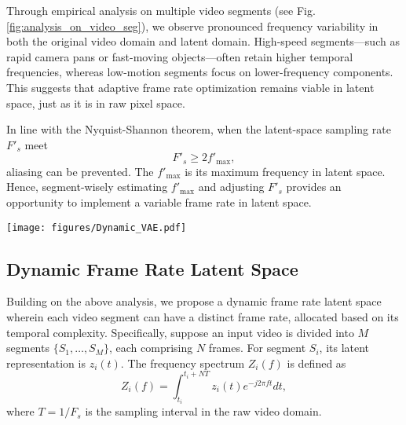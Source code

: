 Through empirical analysis on multiple video segments (see Fig.\ref{fig:analysis_on_video_seg}), we observe pronounced frequency variability in both the original video domain and latent domain. High-speed segments—such as rapid camera pans or fast-moving objects—often retain higher temporal frequencies, whereas low-motion segments focus on lower-frequency components. This suggests that adaptive frame rate optimization remains viable in latent space, just as it is in raw pixel space.

In line with the Nyquist-Shannon theorem, when the latent-space sampling rate $F'_s$ meet
\begin{equation}
F'_s \geq 2f'_{\max},
\end{equation}
aliasing can be prevented. The $f'_{\max}$ is its maximum frequency in latent space. Hence, segment-wisely estimating $f'_{\max}$ and adjusting $F'_s$ provides an opportunity to implement a variable frame rate in latent space. 

\begin{figure*}[!tbhp] %
    \centering
    \texttt{[image: figures/Dynamic\_VAE.pdf]} %
    \vspace{-0.1in}
    \caption{\textbf{Architecture overview of the Dynamic Latent Frame Rate (DLFR) VAE.} The input video is first divided into segments. The dynamic encoder processes these segments through a series of 3D convolution layers interspersed with dynamic downsample operations (Eq.\ref{eq:encoder} in Sec.\ref{subsec:dflr_vae}), where the execution of downsample is determined by the schedule (Sec.\ref{subsec:dflr_Scheduler}). The resulting latent representations maintain varying temporal resolutions according to segment complexity (Sec.\ref{subsec:dflr_space}). The dynamic decoder then reconstructs the video through corresponding upsampling operations (Eq.\ref{eq:decoder} in Sec.\ref{subsec:dflr_vae}), restoring the original frame rate while preserving temporal consistency. Each segment can be processed at different frame rates, enabling content-adaptive temporal compression in latent space.}
    \vspace{-0.1in}
    \label{fig:dynamic_vae}
\end{figure*}

\subsection{Dynamic Frame Rate Latent Space}
\label{subsec:dflr_space}
Building on the above analysis, we propose a dynamic frame rate latent space wherein each video segment can have a distinct frame rate, allocated based on its temporal complexity. Specifically, suppose an input video is divided into $M$ segments $\{S_1,\ldots,S_M\}$, each comprising $N$ frames. For segment $S_i$, its latent representation is $z_i(t)$. The frequency spectrum $Z_i(f)$ is defined as
\begin{equation}
Z_i(f) = \int_{t_i}^{t_i+NT} z_i(t)e^{-j2\pi ft} dt,
\end{equation}
where $T = 1/F_s$ is the sampling interval in the raw video domain.



